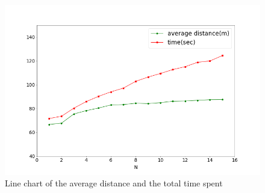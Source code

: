 \begin{figure}[H]
    \centering
    \includegraphics[scale=0.3]{figures/analysis.png}
    \caption{Line chart of the average distance and the total time spent}
    \label{fig:analysis}
\end{figure}

